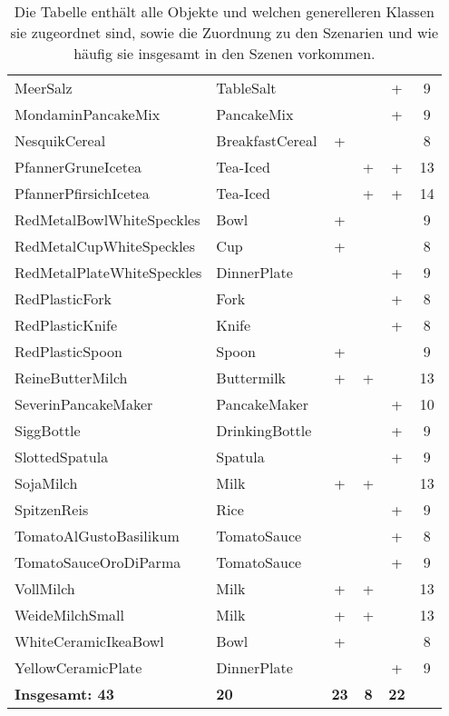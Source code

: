 \begin{table}
\begin{tabularx}{\textwidth}{llcccc}
MeerSalz						& TableSalt			& 			& 			&	+		& 9	\\
MondaminPancakeMix				& PancakeMix		& 			& 			&	+		& 9	\\
NesquikCereal					& BreakfastCereal	& +			& 			&			& 8	\\
PfannerGruneIcetea				& Tea-Iced			& 			& +			&	+		& 13	\\
PfannerPfirsichIcetea			& Tea-Iced			& 			& +			&	+		& 14	\\
RedMetalBowlWhiteSpeckles		& Bowl				& +			& 			&			& 9	\\
RedMetalCupWhiteSpeckles		& Cup				& +			& 			&			& 8	\\
RedMetalPlateWhiteSpeckles		& DinnerPlate		& 			& 			&	+		& 9	\\
RedPlasticFork					& Fork				& 			& 			&	+		& 8	\\
RedPlasticKnife					& Knife				& 			& 			&	+		& 8	\\
RedPlasticSpoon					& Spoon				& +			& 			&			& 9	\\
ReineButterMilch				& Buttermilk		& +			& +			&			& 13	\\
SeverinPancakeMaker				& PancakeMaker		& 			& 			&	+		& 10	\\
SiggBottle						& DrinkingBottle	& 			& 			&	+		& 9	\\
SlottedSpatula					& Spatula			& 			& 			&	+		& 9	\\
SojaMilch						& Milk				& +			& +			&			& 13	\\
SpitzenReis						& Rice				& 			& 			&	+		& 9	\\
TomatoAlGustoBasilikum			& TomatoSauce		& 			& 			&	+		& 8	\\
TomatoSauceOroDiParma			& TomatoSauce		& 			& 			&	+		& 9	\\
VollMilch						& Milk				& +			& +			&			& 13	\\
WeideMilchSmall					& Milk				& +			& +			&			& 13	\\
WhiteCeramicIkeaBowl			& Bowl				& +			& 			&			& 8	\\
YellowCeramicPlate				& DinnerPlate 	    & 			& 			&	+		& 9	\\ \hline
\textbf{Insgesamt: 43}				& \textbf{20}		& \textbf{23} & \textbf{8} & \textbf{22} & 	\\
\end{tabularx}
\caption[Objekte]{Die Tabelle enthält alle Objekte und welchen generelleren Klassen sie zugeordnet sind, sowie die Zuordnung zu den Szenarien und wie häufig sie insgesamt in den Szenen vorkommen.}
\label{tab:unrealObjects}
\end{table}
